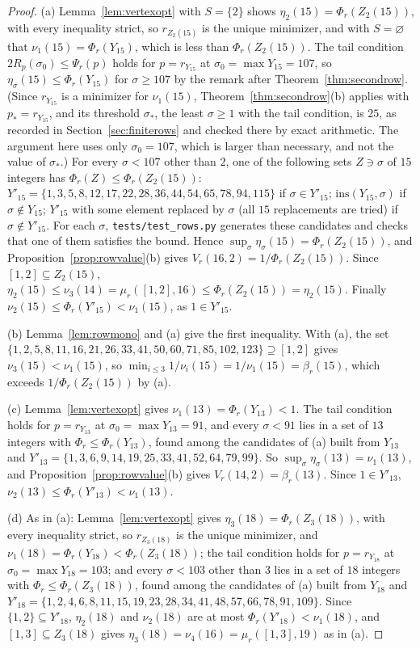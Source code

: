 \documentclass[11pt]{article}
\begin{document}
\begin{proof}
(a) Lemma~\ref{lem:vertexopt} with $S=\{2\}$ shows
$\eta_2(15)=\Phi_r(Z_2(15))$, with every inequality strict, so
$r_{Z_2(15)}$ is the unique minimizer, and with $S=\varnothing$ that
$\nu_1(15)=\Phi_r(Y_{15})$, which is less than $\Phi_r(Z_2(15))$.  The tail
condition $2R_p(\sigma_0)\le\Psi_r(p)$ holds for $p=r_{Y_{15}}$ at
$\sigma_0=\max Y_{15}=107$, so $\eta_\sigma(15)\le\Phi_r(Y_{15})$ for
$\sigma\ge107$ by the remark after Theorem~\ref{thm:secondrow}.  (Since
$r_{Y_{15}}$ is a minimizer for $\nu_1(15)$, Theorem~\ref{thm:secondrow}(b)
applies with $p_*=r_{Y_{15}}$, and its threshold $\sigma_*$, the least
$\sigma\ge1$ with the tail condition, is $25$, as recorded in
Section~\ref{sec:finiterows} and checked there by exact arithmetic.  The
argument here uses only $\sigma_0=107$, which is larger than necessary,
and not the value of $\sigma_*$.)  For every
$\sigma<107$ other than $2$, one of the following sets $Z\ni\sigma$ of $15$ integers has
$\Phi_r(Z)\le\Phi_r(Z_2(15))$:
$Y'_{15}=\{1,3,5,8,12,17,22,28,36,44,54,65,78,94,115\}$ if
$\sigma\in Y'_{15}$; $\mathrm{ins}(Y_{15},\sigma)$ if $\sigma\notin Y_{15}$;
$Y'_{15}$ with some element replaced by $\sigma$ (all $15$ replacements are
tried) if $\sigma\notin Y'_{15}$.
For each $\sigma$, \texttt{tests/test\_rows.py} generates these candidates
and checks that one of them satisfies the bound.  Hence
$\sup_\sigma\eta_\sigma(15)=\Phi_r(Z_2(15))$, and
Proposition~\ref{prop:rowvalue}(b) gives $V_r(16,2)=1/\Phi_r(Z_2(15))$.  Since
$[1,2]\subseteq Z_2(15)$,
$\eta_2(15)\le\nu_3(14)=\mu_r([1,2],16)\le\Phi_r(Z_2(15))=\eta_2(15)$.  Finally
$\nu_2(15)\le\Phi_r(Y'_{15})<\nu_1(15)$, as $1\in Y'_{15}$.

(b) Lemma~\ref{lem:rowmono} and (a) give the first inequality.  With (a),
the set $\{1,2,5,8,11,16,21,26,33,41,50,60,71,85,102,123\}\supseteq[1,2]$
gives $\nu_3(15)<\nu_1(15)$, so
$\min_{i\le3}1/\nu_i(15)=1/\nu_1(15)=\beta_r(15)$, which exceeds
$1/\Phi_r(Z_2(15))$ by (a).

(c) Lemma~\ref{lem:vertexopt} gives $\nu_1(13)=\Phi_r(Y_{13})<1$.  The
tail condition holds for $p=r_{Y_{13}}$ at $\sigma_0=\max Y_{13}=91$, and every
$\sigma<91$ lies in a set of $13$ integers with
$\Phi_r\le\Phi_r(Y_{13})$, found among the candidates of (a) built from
$Y_{13}$ and
$Y'_{13}=\{1,3,6,9,14,19,25,33,41,52,64,79,99\}$.  So
$\sup_\sigma\eta_\sigma(13)=\nu_1(13)$, and
Proposition~\ref{prop:rowvalue}(b) gives $V_r(14,2)=\beta_r(13)$.  Since
$1\in Y'_{13}$, $\nu_2(13)\le\Phi_r(Y'_{13})<\nu_1(13)$.

(d) As in (a): Lemma~\ref{lem:vertexopt} gives $\eta_3(18)=\Phi_r(Z_3(18))$,
with every inequality strict, so $r_{Z_3(18)}$ is the unique minimizer,
and $\nu_1(18)=\Phi_r(Y_{18})<\Phi_r(Z_3(18))$; the tail condition holds for
$p=r_{Y_{18}}$ at $\sigma_0=\max Y_{18}=103$; and every $\sigma<103$ other than $3$
lies in a set of $18$ integers with $\Phi_r\le\Phi_r(Z_3(18))$, found among
the candidates of (a) built from $Y_{18}$ and
$Y'_{18}=\{1,2,4,6,8,11,15,19,23,28,34,41,48,57,66,78,91,109\}$.  Since
$\{1,2\}\subseteq Y'_{18}$, $\eta_2(18)$ and $\nu_2(18)$ are at most
$\Phi_r(Y'_{18})<\nu_1(18)$, and $[1,3]\subseteq Z_3(18)$ gives
$\eta_3(18)=\nu_4(16)=\mu_r([1,3],19)$ as in (a).
\end{proof}
\end{document}
